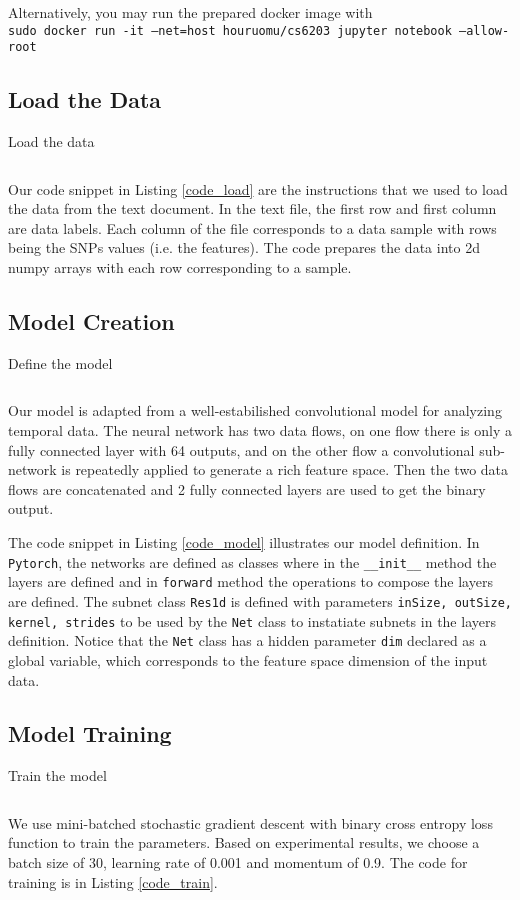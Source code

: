 \documentclass[a4paper,12pt]{article}
\newcommand{\torch}{\texttt{Pytorch}}
\begin{document}
Alternatively, you may run the prepared docker image with\\
\texttt{sudo docker run -it --net=host houruomu/cs6203 jupyter notebook --allow-root}

\subsection{Load the Data}
\begin{listing}[H]
	\caption{Load the data}
	\inputminted[frame=single,framesep=10pt,linenos]{python3}{load_data.py}
	\label{code_load}
\end{listing}
Our code snippet in Listing \ref{code_load} are the instructions that we used to load the data from the text document. In the text file, the first row and first column are data labels. Each column of the file corresponds to a data sample with rows being the SNPs values (i.e. the features). The code prepares the data into 2d numpy arrays with each row corresponding to a sample.

\subsection{Model Creation}
\begin{listing}[H]
	\caption{Define the model}
	\inputminted[frame=single,framesep=10pt,linenos]{python3}{torch_model.py}
	\label{code_model}
\end{listing}
Our model is adapted from a well-estabilished convolutional model for analyzing temporal data. The neural network has two data flows, on one flow there is only a fully connected layer with 64 outputs, and on the other flow a convolutional sub-network is repeatedly applied to generate a rich feature space. Then the two data flows are concatenated and 2 fully connected layers are used to get the binary output.

The code snippet in Listing \ref{code_model} illustrates our model definition. In \torch, the networks are defined as classes where in the \texttt{\_\_init\_\_} method the layers are defined and in \texttt{forward} method the operations to compose the layers are defined. The subnet class \texttt{Res1d} is defined with parameters \texttt{inSize, outSize, kernel, strides} to be used by the \texttt{Net} class to instatiate subnets in the layers definition. Notice that the \texttt{Net} class has a hidden parameter \texttt{dim} declared as a global variable, which corresponds to the feature space dimension of the input data.

\subsection{Model Training}
\begin{listing}[H]
	\caption{Train the model}
	\inputminted[frame=single,framesep=10pt,linenos]{python3}{train.py}
	\label{code_train}
\end{listing}
We use mini-batched stochastic gradient descent with binary cross entropy loss function to train the parameters. Based on experimental results, we choose a batch size of 30, learning rate of 0.001 and momentum of 0.9. The code for training is in Listing \ref{code_train}.
\end{document}
